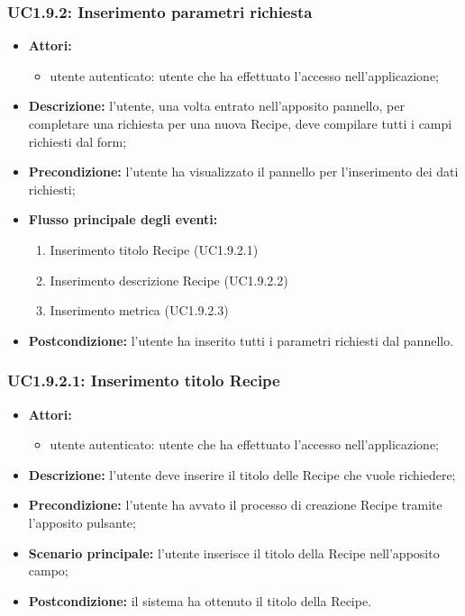\subsubsection{UC1.9.2: Inserimento parametri richiesta}
\begin{itemize}
	\item \textbf{Attori:}
	\begin{itemize}
		\item utente autenticato: utente che ha effettuato l'accesso nell'applicazione;
	\end{itemize}
	\item \textbf{Descrizione:} l'utente, una volta entrato nell'apposito pannello, per completare una richiesta per una nuova Recipe, deve compilare tutti i campi richiesti dal form;
	\item \textbf{Precondizione:} l'utente ha visualizzato il pannello per l'inserimento dei dati richiesti;
	\item \textbf{Flusso principale degli eventi:}
	\begin{enumerate}
		\item Inserimento titolo Recipe (UC1.9.2.1)
		\item Inserimento descrizione Recipe (UC1.9.2.2)
		\item Inserimento metrica (UC1.9.2.3)
	\end{enumerate}
	\item \textbf{Postcondizione:} l'utente ha inserito tutti i parametri richiesti dal pannello.
\end{itemize}

\subsubsection{UC1.9.2.1: Inserimento titolo Recipe}
\begin{itemize}
	\item \textbf{Attori:}
	\begin{itemize}
		\item utente autenticato: utente che ha effettuato l'accesso nell'applicazione;
	\end{itemize}
	\item \textbf{Descrizione:} l'utente deve inserire il titolo delle Recipe che vuole richiedere;
	\item \textbf{Precondizione:} l'utente ha avvato il processo di creazione Recipe tramite l'apposito pulsante;
	\item \textbf{Scenario principale:} l'utente inserisce il titolo della Recipe nell'apposito campo;
	\item \textbf{Postcondizione:} il sistema ha ottenuto il titolo della Recipe.
\end{itemize}

